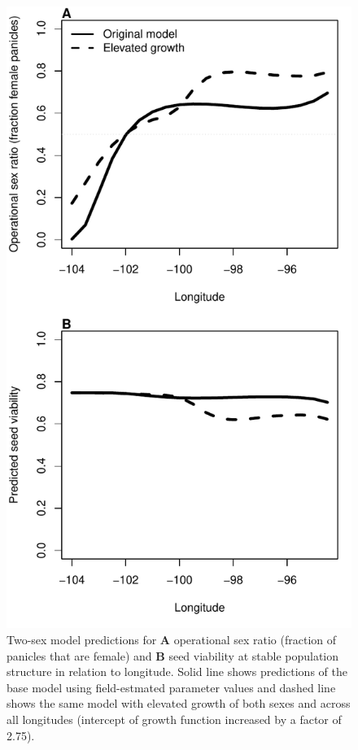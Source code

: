\documentclass[11pt]{article}
\begin{document}
\begin{figure}[H]
	\begin{center}
		\includegraphics[width=0.5\linewidth]{Figures/elevated_growth_SR_viab}
		\caption{Two-sex model predictions for \textbf{A} operational sex ratio (fraction of panicles that are female) and \textbf{B} seed viability at stable population structure in relation to longitude. 
			Solid line shows predictions of the base model using field-estmated parameter values and dashed line shows the same model with elevated growth of both sexes and across all longitudes (intercept of growth function increased by a factor of 2.75). }
		\label{fig:elevated_growth_SR_viab}
	\end{center}
\end{figure}
\end{document}
